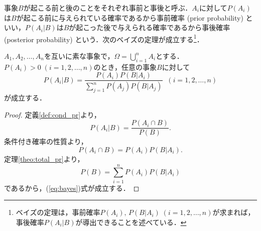 \documentclass{jsreport}
\begin{document}
事象$B$が起こる前と後のことをそれぞれ事前と事後と呼ぶ．$A_i$に対して$P(A_i)$は$B$が起こる前に与えられている確率であるから事前確率 (prior probability) といい，$P(A_i | B)$は$B$が起こった後で与えられる確率であるから事後確率 (posterior probability) という．次のベイズの定理が成立する\footnote{ベイズの定理は，事前確率$P(A_i),\, P(B|A_i) \; (i = 1, 2, \ldots, n)$が求まれば，事後確率$P(A_i|B)$が導出できることを述べている．}．
\begin{screen}
  \begin{theo}[ベイズの定理]\label{theo:bayes}
    $A_1, A_2, \ldots, A_n$を互いに素な事象で，$\Omega = \bigcup_{i = 1}^n A_i$とする．
    $P(A_i) > 0 \; (i = 1,2, \ldots, n)$のとき，任意の事象$B$に対して
    \begin{equation}\label{eq:bayes}
      P(A_i | B) = \frac{P(A_i) P(B | A_i)}{\sum_{j = 1}^n P(A_j) P(B | A_j)} \; \; (i = 1, 2, \ldots, n)
    \end{equation}
    が成立する．
  \end{theo}
\end{screen}

\begin{proof}
  定義\ref{def:cond_pr}より，
  \begin{equation}
    P(A_i|B) = \frac{P(A_i \cap B)}{P(B)}. \nonumber
  \end{equation}
  条件付き確率の性質より，
  \begin{equation}
    P(A_i \cap B) = P(A_i) P(B | A_i). \nonumber
  \end{equation}
  定理\ref{theo:total_pr}より，
  \begin{equation}
    P(B) = \sum_{i = 1}^n P(A_i) P(B | A_i)
  \end{equation}
  であるから，(\ref{eq:bayes})式が成立する．
\end{proof}
\end{document}
